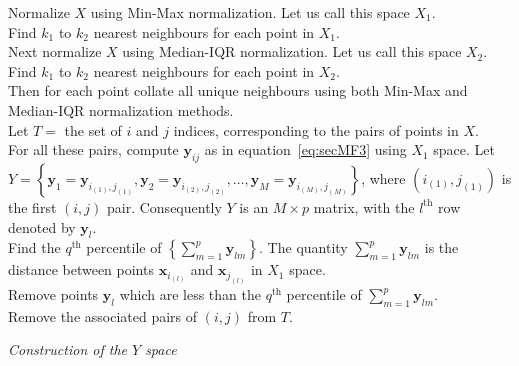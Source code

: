 \documentclass[11pt]{article}
\begin{document}
\DontPrintSemicolon
\begin{algorithm}\fontsize{9}{10}\selectfont
	Normalize $X$ using Min-Max normalization. Let us call this space $X_1$.  \\
	Find $k_1$ to $k_2$ nearest neighbours for each point in  $X_1$. \\
	Next normalize $X$ using Median-IQR normalization. Let us call this space $X_2$.  \\
	Find $k_1$ to $k_2$ nearest neighbours for each point in  $X_2$. \\
	Then for each point collate all unique neighbours using both Min-Max and Median-IQR normalization methods.   \\
	Let $T = $ the set of $i$ and $j$ indices, corresponding to the pairs of points in $X$. \\
	For all these pairs, compute $\bm{y}_{ij}$ as in equation~\eqref{eq:secMF3} using $X_1$ space. Let $Y =\left\{ \bm{y}_{1} =\bm{y}_{i_{(1)},j_{(1)}} , \bm{y}_{2} =\bm{y}_{i_{(2)},j_{(2)}}, \ldots, \bm{y}_{M} =\bm{y}_{i_{(M)},j_{(M)}} \right\}$, where $\left( i_{(1)},j_{(1)} \right)$ is the first $(i, j)$ pair. Consequently $Y$ is an $M\times p$ matrix, with the $l^{\text{th}}$ row denoted by $\bm{y}_l$.\\
	Find the $q^{\text{th}}$ percentile of $ \left\{\sum_{m=1}^p \bm{y}_{lm}\right\}$. The quantity $\sum_{m=1}^p \bm{y}_{lm}$ is the distance between points $\bm{x}_{i_{(l)}}$ and $\bm{x}_{j_{(l)}}$ in  $X_1$  space. \\
	Remove points $\bm{y}_l$ which are less than the  $q^{\text{th}}$ percentile of  $ \sum_{m=1}^p \bm{y}_{lm} $. \\
	Remove the associated pairs of $(i, j)$ from $T$.
	\caption{\itshape Construction of the $Y$ space}
	\label{algo:YSpace}
\end{algorithm}
\end{document}
